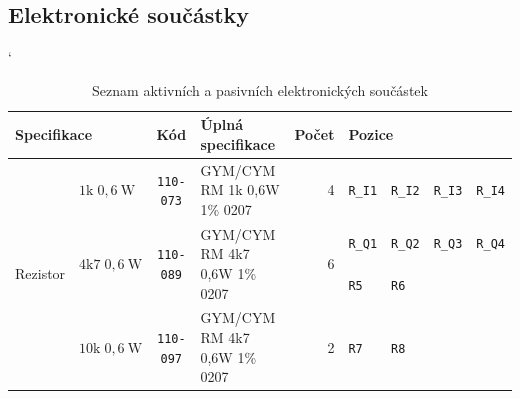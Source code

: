 \documentclass[twoside,project,skipblank]{../MFFPrace}
\begin{document}
\subsection{Elektronické součástky}
\begin{landscape}
    \catcode`
    \begin{table}[!h]
        \centering
        \caption{Seznam aktivních a pasivních elektronických součástek}
        \begin{tabular}{|l|l||c|l|r||l|l|l|l|}
            \hline
            \multicolumn{2}{|l||}{\textbf{Specifikace}}                                  & \textbf{Kód}                                   & \textbf{Úplná specifikace}                       & \textbf{Počet}                                           & \multicolumn{4}{l|}{\textbf{Pozice}}                                                                                          \\\hline
            \multirow{4}{*}{Rezistor}                                                    & $1\text{k}\;0{,}6\:\text{W}$                   & \texttt{110-073}                                 & \tiny{GYM/CYM RM 1k 0,6W 1\% 0207}                       & 4                                    & \texttt{R\_I1}        & \texttt{R\_I2}        & \texttt{R\_I3}        & \texttt{R\_I4} \\\cline{2-9}
                                                                                         & \multirow{2}{*}{$4\text{k}7\;0{,}6\:\text{W}$} & \multirow{2}{*}{\texttt{110-089}}                & \multirow{2}{*}{\tiny{GYM/CYM RM 4k7 0,6W 1\% 0207}}     & \multirow{2}{*}{6}                   & \texttt{R\_Q1}        & \texttt{R\_Q2}        & \texttt{R\_Q3}        & \texttt{R\_Q4} \\\cline{6-9}
                                                                                         &                                                &                                                  &                                                          &                                      & \texttt{R5}           & \texttt{R6}           & \multicolumn{2}{l|}{}                  \\\cline{2-9}
                                                                                         & $10\text{k}\;0{,}6\:\text{W}$                  & \texttt{110-097}                                 & \tiny{GYM/CYM RM 4k7 0,6W 1\% 0207}                      & 2                                    & \texttt{R7}           & \texttt{R8}           & \multicolumn{2}{l|}{}                  \\\hline

\end{tabular}
\end{table}
\end{landscape}
\end{document}
